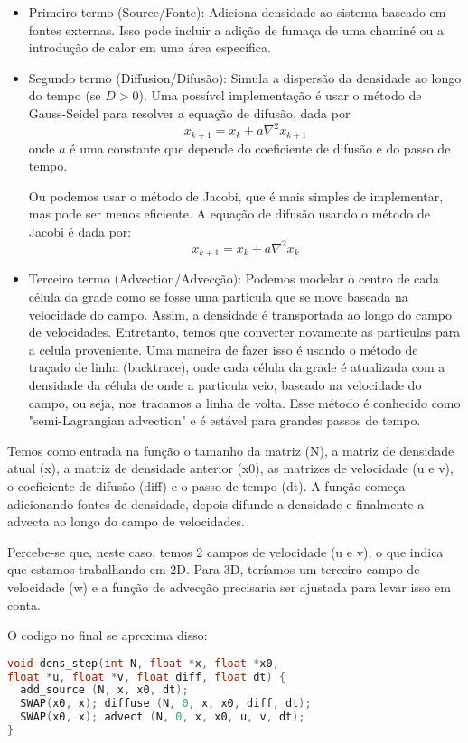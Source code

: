 \begin{itemize}
  \item Primeiro termo (Source/Fonte): Adiciona densidade ao sistema baseado em fontes externas. Isso pode incluir a adição de fumaça de uma chaminé ou a introdução de calor em uma área específica.
  \item Segundo termo (Diffusion/Difusão): Simula a dispersão da densidade ao longo do tempo (se $D > 0$). Uma possível implementação é usar o método de Gauss-Seidel para resolver a equação de difusão, dada por 
    $$
    x_{k+1} = x_k + a \nabla^2 x_{k+1}
    $$
    onde $a$ é uma constante que depende do coeficiente de difusão e do passo de tempo. 

    Ou podemos usar o método de Jacobi, que é mais simples de implementar, mas pode ser menos eficiente. A equação de difusão usando o método de Jacobi é dada por:
    $$
    x_{k+1} = x_k + a \nabla^2 x_k
    $$

  \item Terceiro termo (Advection/Advecção): Podemos modelar o centro de cada célula da grade como se fosse uma particula que se move baseada na velocidade do campo. Assim, a densidade é transportada ao longo do campo de velocidades. Entretanto, temos que converter novamente as particulas para a celula proveniente. Uma maneira de fazer isso é usando o método de traçado de linha (backtrace), onde cada célula da grade é atualizada com a densidade da célula de onde a particula veio, baseado na velocidade do campo, ou seja, nos tracamos a linha de volta. Esse método é conhecido como "semi-Lagrangian advection" e é estável para grandes passos de tempo.

\end{itemize}


Temos como entrada na função o tamanho da matriz (N), a matriz de densidade atual (x), a matriz de densidade anterior (x0), as matrizes de velocidade (u e v), o coeficiente de difusão (diff) e o passo de tempo (dt). A função começa adicionando fontes de densidade, depois difunde a densidade e finalmente a advecta ao longo do campo de velocidades.

Percebe-se que, neste caso, temos 2 campos de velocidade (u e v), o que indica que estamos trabalhando em 2D. Para 3D, teríamos um terceiro campo de velocidade (w) e a função de advecção precisaria ser ajustada para levar isso em conta.

O codigo no final se aproxima disso:
\begin{lstlisting}[language=C]
void dens_step(int N, float *x, float *x0, 
float *u, float *v, float diff, float dt) {
  add_source (N, x, x0, dt);
  SWAP(x0, x); diffuse (N, 0, x, x0, diff, dt);
  SWAP(x0, x); advect (N, 0, x, x0, u, v, dt);
}
\end{lstlisting}


